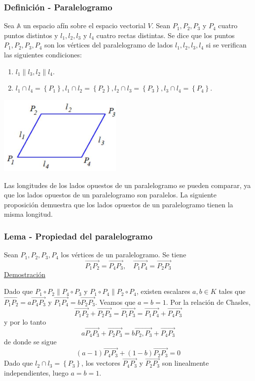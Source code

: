 \documentclass[12pt, a4paper, ones, notitlepage, openany,titlepage]{article}
\newcommand{\demostracion}{\noindent\underline{Demostración}}
\begin{document}
\subsubsection{Definición - Paralelogramo}
Sea $\mathbb{A}$ un espacio afín sobre el espacio vectorial $V$. Sean $P_{1}, P_{2}, P_{3}$ y $P_{4}$ cuatro puntos distintos y $l_{1}, l_{2}, l_{3}$ y $l_{4}$ cuatro rectas distintas. Se dice que los puntos $P_{1}, P_{2}, P_{3}, P_{4}$ son los vértices del paralelogramo de lados $l_{1}, l_{2}, l_{3}, l_{4}$ si se verifican las siguientes condiciones:
\begin{enumerate}[label=(\arabic*)]
\item $l_{1}\left\|l_{3}, l_{2}\right\| l_{4}$.

\item $l_{1} \cap l_{4}=\left\{P_{1}\right\}, l_{1} \cap l_{2}=\left\{P_{2}\right\}, l_{2} \cap l_{3}=\left\{P_{3}\right\}, l_{3} \cap l_{4}=\left\{P_{4}\right\}$.
\end{enumerate}
\begin{center}
\includegraphics[max width=6cm]{2023_03_01_7659aec5e35f9a9b2d3cg-19}
\end{center}

Las longitudes de los lados opuestos de un paralelogramo se pueden comparar, ya que los lados opuestos de un paralelogramo son paralelos. La siguiente proposición demuestra que los lados opuestos de un paralelogramo tienen la misma longitud.

\subsubsection{Lema - Propiedad del paralelogramo}
Sean $P_{1}, P_{2}, P_{3}, P_{4}$ los vértices de un paralelogramo. Se tiene
$$
\overrightarrow{P_{1} P_{2}}=\overrightarrow{P_{4} P_{3}}, \quad \overrightarrow{P_{1} P_{4}}=\overrightarrow{P_{2} P_{3}}
$$
\demostracion

Dado que $P_{1} \circ P_{2} \| P_{4} \circ P_{3}$ y $P_{1} \circ P_{4} \| P_{2} \circ P_{4}$, existen escalares $a, b \in K$ tales que $\overrightarrow{P_{1} P_{2}}=a \overrightarrow{P_{4} P_{3}}$ y $\overrightarrow{P_{1} P_{4}}=b \overrightarrow{P_{2} P_{3}}$. Veamos que $a=b=1$. Por la relación de Chasles,
$$
\overrightarrow{P_{1} P_{2}}+\overrightarrow{P_{2} P_{3}}=\overrightarrow{P_{1} P_{3}}=\overrightarrow{P_{1} P_{4}}+\overrightarrow{P_{4} P_{3}}
$$
y por lo tanto
$$
a \overrightarrow{P_{4} P_{3}}+\overrightarrow{P_{2} P_{3}}=b \overrightarrow{P_{2}, P_{3}}+\overrightarrow{P_{4} P_{3}}
$$
de donde se sigue
$$
(a-1) \overrightarrow{P_{4} P_{3}}+(1-b) \overrightarrow{P_{2} P_{3}}=0
$$
Dado que $l_{2} \cap l_{3}=\left\{P_{3}\right\}$, los vectores $\overrightarrow{P_{4} P_{3}}$ y $\overrightarrow{P_{2} P_{3}}$ son linealmente independientes, luego $a=b=1$.
\end{document}
